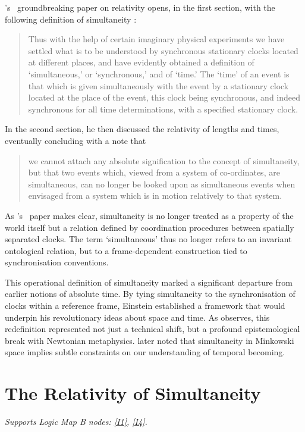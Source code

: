 \documentclass[12pt]{book}
\begin{document}
\citeauthor{Einstein1905a}'s~\citeyearpar{Einstein1905a} groundbreaking paper on relativity opens, in the first section, with the following definition of simultaneity \citep{Einstein1952}:
\begin{quote}
Thus with the help of certain imaginary physical experiments we have settled what is to be understood by synchronous stationary clocks located at different places, and have evidently obtained a definition of `simultaneous,' or `synchronous,' and of `time.' The `time' of an event is that which is given simultaneously with the event by a stationary clock located at the place of the event, this clock being synchronous, and indeed synchronous for all time determinations, with a specified stationary clock.
\end{quote}
In the second section, he then discussed the relativity of lengths and times, eventually concluding with a note that
\begin{quote}
we cannot attach any absolute signification to the concept of simultaneity, but that two events which, viewed from a system of co-ordinates, are simultaneous, can no longer be looked upon as simultaneous events when envisaged from a system which is in motion relatively to that system.
\end{quote}
As \citeauthor{Einstein1905a}'s~\citeyearpar{Einstein1905a} paper makes clear, simultaneity is no longer treated as a property of the world itself but a relation defined by coordination procedures between spatially separated clocks. The term `simultaneous' thus no longer refers to an invariant ontological relation, but to a frame-dependent construction tied to synchronisation conventions.

This operational definition of simultaneity marked a significant departure from earlier notions of absolute time. By tying simultaneity to the synchronisation of clocks within a reference frame, Einstein established a framework that would underpin his revolutionary ideas about space and time. As \cite{jammer2006} observes, this redefinition represented not just a technical shift, but a profound epistemological break with Newtonian metaphysics. \cite{Stein1968} later noted that simultaneity in Minkowski space implies subtle constraints on our understanding of temporal becoming.

\section{The Relativity of Simultaneity}\label{sec:2.1}
\noindent\textit{Supports Logic Map B nodes: \hyperref[appendix:I1]{[I1]}, \hyperref[appendix:I4]{[I4]}.}
\end{document}
